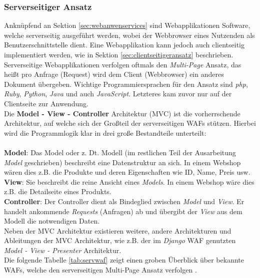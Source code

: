 \subsubsection{Serverseitiger Ansatz}\label{sec:serverseitgeransatz}
Anknüpfend an Sektion \ref{sec:webanwenservices} sind Webapplikationen Software, welche serverseitig ausgeführt werden, wobei der Webbrowser eines Nutzenden als Benutzerschnittstelle dient. Eine Webapplikation kann jedoch auch clientseitig implementiert werden, wie in Sektion \ref{sec:clientseitigeransatz} beschrieben. \\ 
Serverseitige Webapplikationen verfolgen oftmals den \emph{Multi-Page} Ansatz, das heißt pro Anfrage (Request) wird dem Client (Webbrowser) ein anderes Dokument  übergeben. Wichtige Programmiersprachen für den Ansatz sind \emph{php}, \emph{Ruby}, \emph{Python}, \emph{Java} und auch \emph{JavaScript}. Letzteres kam zuvor nur auf der Clientseite zur Anwendung. \\
Die \textbf{Model - View - Controller} Architektur (MVC) ist die vorherrschende Architektur, auf welche sich der Großteil der serverseitigen WAFs stützen.
Hierbei wird die Programmlogik klar in drei große Bestandteile unterteilt: \\ \\
\textbf{Model}: Das Model oder z. Dt. Modell (im restlichen Teil der Ausarbeitung \emph{Model} geschrieben) beschreibt eine Datenstruktur an sich. In einem Webshop wären dies z.B. die Produkte und deren Eigenschaften wie ID, Name, Preis usw. \\
\textbf{View}: Sie beschreibt die reine Ansicht eines \emph{Models}. In einem Webshop wäre dies z.B. die Detailseite eines Produkts. \\
\textbf{Controller}: Der Controller dient als Bindeglied zwischen \emph{Model} und \emph{View}. Er handelt ankommende \emph{Requests} (Anfragen) ab und übergibt der \emph{View} aus dem Modell die notwendigen Daten. \\ 
Neben der MVC Architektur existieren weitere, andere Architekturen und Ableitungen der MVC Architektur, wie z.B. der im \emph{Django} WAF genutzten \emph{Model - View - Presenter} Architektur. \\
Die folgende Tabelle \ref{tab:servwaf} zeigt einen groben Überblick über bekannte WAFs, welche den serverseitigen Multi-Page Ansatz verfolgen \cite{TopWebDe0:online}. 

